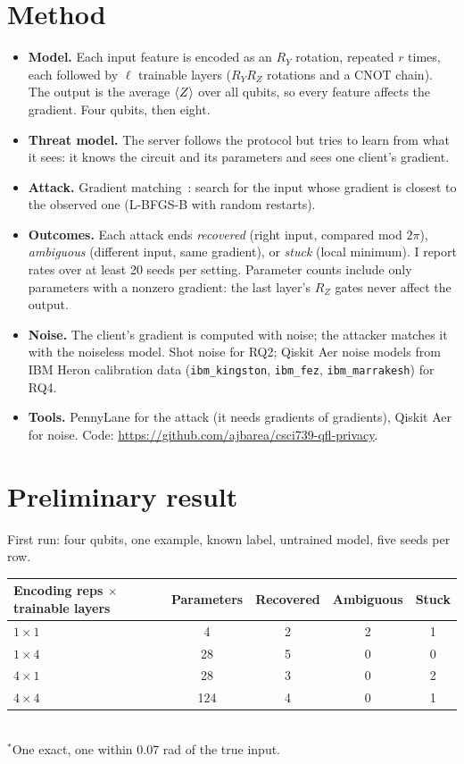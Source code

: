 \documentclass[11pt]{article}
\begin{document}
\section*{Method}

\begin{itemize}
  \item \textbf{Model.} Each input feature is encoded as an $R_Y$ rotation, repeated $r$ times,
        each followed by $\ell$ trainable layers ($R_Y R_Z$ rotations and a CNOT chain). The
        output is the average $\braket{Z}$ over all qubits, so every feature affects the
        gradient. Four qubits, then eight.
  \item \textbf{Threat model.} The server follows the protocol but tries to learn from what it
        sees: it knows the circuit and its parameters and sees one client's gradient.
  \item \textbf{Attack.} Gradient matching~\cite{zhu2019}: search for the input whose gradient is
        closest to the observed one (L-BFGS-B with random restarts).
  \item \textbf{Outcomes.} Each attack ends \emph{recovered} (right input, compared mod $2\pi$),
        \emph{ambiguous} (different input, same gradient), or \emph{stuck} (local minimum).
        I report rates over at least 20 seeds per setting. Parameter counts include only
        parameters with a nonzero gradient: the last layer's $R_Z$ gates never affect the output.
  \item \textbf{Noise.} The client's gradient is computed with noise; the attacker matches it
        with the noiseless model. Shot noise for RQ2; Qiskit Aer noise models from IBM Heron
        calibration data (\texttt{ibm\_kingston}, \texttt{ibm\_fez}, \texttt{ibm\_marrakesh}) for
        RQ4.
  \item \textbf{Tools.} PennyLane for the attack (it needs gradients of gradients), Qiskit Aer for
        noise. Code: \url{https://github.com/ajbarea/csci739-qfl-privacy}.
\end{itemize}

\section*{Preliminary result}

First run: four qubits, one example, known label, untrained model, five seeds per row.

\begin{center}
\begin{tabular}{@{}lcccc@{}}
  \toprule
  Encoding reps $\times$ trainable layers & Parameters & Recovered & Ambiguous & Stuck \\
  \midrule
  $1 \times 1$ & 4   & 2\rlap{$^*$} & 2 & 1 \\
  $1 \times 4$ & 28  & 5 & 0 & 0 \\
  $4 \times 1$ & 28  & 3 & 0 & 2 \\
  $4 \times 4$ & 124 & 4 & 0 & 1 \\
  \bottomrule
\end{tabular}\\[2pt]
{\small $^*$One exact, one within 0.07 rad of the true input.}
\end{center}
\end{document}
